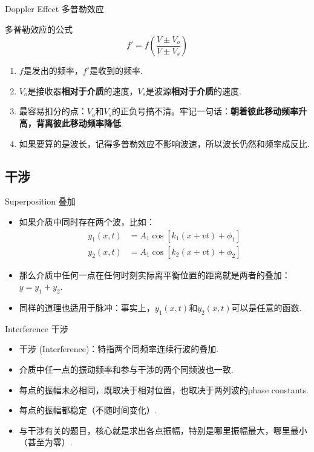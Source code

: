 \documentclass{beamer}
\begin{document}
\begin{frame}{Doppler Effect 多普勒效应}
	\begin{block}{多普勒效应的公式}
		\[f' = f\left(\frac{V \pm V_o}{V \pm V_s}\right)\]
	\end{block}
	
	\begin{enumerate}
		\item $f$是发出的频率，$f'$是收到的频率.
		\item $V_o$是接收器\textbf{相对于介质}的速度，$V_s$是波源\textbf{相对于介质}的速度.
		\item 最容易扣分的点：$V_o$和$V_s$的正负号搞不清。牢记一句话：\textbf{朝着彼此移动频率升高，背离彼此移动频率降低}.
		\item 如果要算的是波长，记得多普勒效应不影响波速，所以波长仍然和频率成反比.
	\end{enumerate}
\end{frame}

\subsection{干涉}

\begin{frame}{Superposition 叠加}
	\begin{itemize}
		\item 如果介质中同时存在两个波，比如：
		\begin{align*}
			y_1\left(x, t\right) &= A_1 \cos \left[k_1 \left(x + vt\right) + \phi_1\right]\\
			y_2\left(x, t\right) &= A_1 \cos \left[k_2 \left(x + vt\right) + \phi_2\right]
		\end{align*}
		
		\item 那么介质中任何一点在任何时刻实际离平衡位置的距离就是两者的叠加：$y = y_1 + y_2$.
		\item 同样的道理也适用于脉冲：事实上，$y_1\left(x, t\right)$和$y_2\left(x, t\right)$可以是任意的函数.
	\end{itemize}
\end{frame}

\begin{frame}{Interference 干涉}
	\begin{itemize}
		\item 干涉 (Interference)：特指两个同频率连续行波的叠加.
		\item 介质中任一点的振动频率和参与干涉的两个同频波也一致.
		\item 每点的振幅未必相同，既取决于相对位置，也取决于两列波的phase constants.
		\item 每点的振幅都稳定（不随时间变化）.
		\item 与干涉有关的题目，核心就是求出各点振幅，特别是哪里振幅最大，哪里最小（甚至为零）.
	\end{itemize}
\end{frame}
\end{document}
